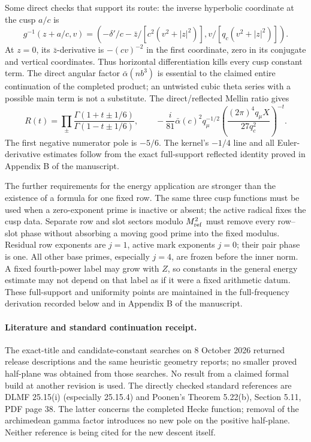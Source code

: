 \documentclass[12pt]{article}
\begin{document}
Some direct checks that support its route: the inverse hyperbolic
coordinate at the cusp \(a/c\) is
\[
 g^{-1}(z+a/c,v)=
 \left(-\delta'/c-\bar z/[c^2(v^2+|z|^2)],
             v/[q_c(v^2+|z|^2)]\right).
\]
At \(z=0\), its \(\bar z\)-derivative is \(-(cv)^{-2}\) in the
first coordinate, zero in its conjugate and vertical coordinates.
Thus horizontal differentiation kills every cusp constant term.
The direct angular factor \(\bar\alpha(nb^3)\) is essential to
the claimed entire continuation of the completed product;
an untwisted cubic theta series with a possible main term is not
a substitute.
The direct/reflected Mellin ratio gives
\[
 R(t)=\prod_{\pm}
 \frac{\Gamma(1+t\pm1/6)}{\Gamma(1-t\pm1/6)},\qquad
 -\frac{i}{81}\bar\alpha(c)^2q_\mu^{-1/2}
 \left(\frac{(2\pi)^4q_\mu X}{27q_c^2}\right)^{-t}.
\]
The first negative numerator pole is \(-5/6\).
The kernel's \(-1/4\) line and all Euler-derivative estimates
follow from the exact full-support reflected identity proved in
Appendix B of the manuscript.

The further requirements for the energy application are stronger
than the existence of a formula for one fixed row.  The same
three cusp functions must be used when a zero-exponent prime is
inactive or absent; the active radical fixes the cusp data.
Separate row and slot sectors modulo \(M_{\rm ref}^2\) must remove
every row--slot phase without absorbing a moving good prime into
the fixed modulus.  Residual row exponents are \(j=1\), active
mark exponents \(j=0\); their pair phase is one.
All other base primes, especially \(j=4\), are frozen before the
inner norm.  A fixed fourth-power label may grow with \(Z\),
so constants in the general energy estimate may not depend on
that label as if it were a fixed arithmetic datum.
These full-support and uniformity points are maintained in the
full-frequency derivation recorded below and in Appendix B of the
manuscript.


\paragraph{Literature and standard continuation receipt.}
The exact-title and candidate-constant searches on 8 October 2026
returned release descriptions and the same heuristic geometry reports;
no smaller proved half-plane was obtained from those searches.
No result from a claimed formal build at another revision is used.
The directly checked standard references are DLMF 25.15(i)
(especially 25.15.4) and Poonen's Theorem 5.22(b), Section 5.11,
PDF page 38.  The latter concerns the completed Hecke function;
removal of the archimedean gamma factor introduces no new pole
on the positive half-plane.  Neither reference is being cited for the new descent itself.
\end{document}
